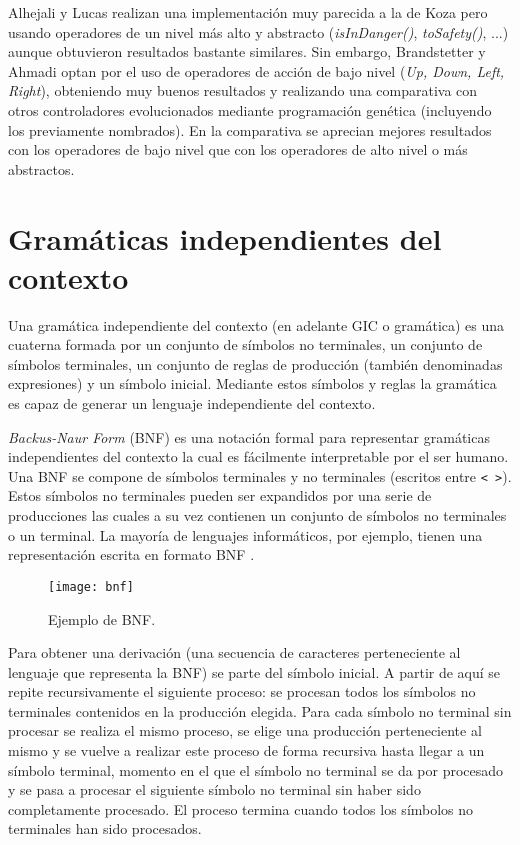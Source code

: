 Alhejali y Lucas \cite{alhejali2010evolving} realizan una implementación muy parecida a la de Koza pero usando operadores de un nivel más alto y abstracto (\textit{isInDanger()}, \textit{toSafety()}, ...) aunque obtuvieron resultados bastante similares. Sin embargo, Brandstetter y Ahmadi \cite{brandstetter2012reactive} optan por el uso de operadores de acción de bajo nivel (\textit{Up, Down, Left, Right}), obteniendo muy buenos resultados y realizando una comparativa con otros controladores evolucionados mediante programación genética (incluyendo los previamente nombrados). En la comparativa se aprecian mejores resultados con los operadores de bajo nivel que con los operadores de alto nivel o más abstractos.

\section{Gramáticas independientes del contexto}
Una gramática independiente del contexto (en adelante GIC o gramática) es una cuaterna formada por un conjunto de símbolos no terminales, un conjunto de símbolos terminales, un conjunto de reglas de producción (también denominadas expresiones) y un símbolo inicial. Mediante estos símbolos y reglas la gramática es capaz de generar un lenguaje independiente del contexto\cite{hopcroft_motwani_ullman_2007}\cite{HolgerApuntes}.

\textit{Backus-Naur Form} (BNF) es una notación formal para representar gramáticas independientes del contexto la cual es fácilmente interpretable por el ser humano. Una BNF se compone de símbolos terminales y no terminales (escritos entre \texttt{< >}). Estos símbolos no terminales pueden ser expandidos por una serie de producciones las cuales a su vez contienen un conjunto de símbolos no terminales o un terminal. La mayoría de lenguajes informáticos, por ejemplo, tienen una representación escrita en formato BNF \cite{garshol2003bnf}.

\begin{figure}[H]
\centering
\texttt{[image: bnf]}
\caption{Ejemplo de BNF.}
\end{figure}

Para obtener una derivación (una secuencia de caracteres perteneciente al lenguaje que representa la BNF) se parte del símbolo inicial. A partir de aquí se repite recursivamente el siguiente proceso: se procesan todos los símbolos no terminales contenidos en la producción elegida. Para cada símbolo no terminal sin procesar se realiza el mismo proceso, se elige una producción perteneciente al mismo y se vuelve a realizar este proceso de forma recursiva hasta llegar a un símbolo terminal, momento en el que el símbolo no terminal se da por procesado y se pasa a procesar el siguiente símbolo no terminal sin haber sido completamente procesado. El proceso termina cuando todos los símbolos no terminales han sido procesados.

